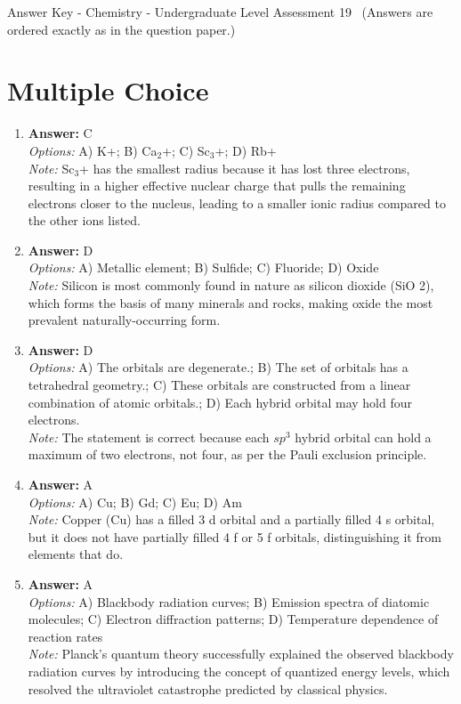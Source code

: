 \documentclass[12pt]{article}
\begin{document}
\begin{center}
Answer Key - Chemistry - Undergraduate Level Assessment 19 \
\small (Answers are ordered exactly as in the question paper.)
\end{center}

\section*{Multiple Choice}
\begin{enumerate}[label=\arabic*.]
\item \textbf{Answer:} C
\\ \textit{Options:} A) K+; B) Ca$_{2}$+; C) Sc$_{3}$+; D) Rb+
\\ \textit{Note:} Sc$_{3}$+ has the smallest radius because it has lost three electrons, resulting in a higher effective nuclear charge that pulls the remaining electrons closer to the nucleus, leading to a smaller ionic radius compared to the other ions listed.
\item \textbf{Answer:} D
\\ \textit{Options:} A) Metallic element; B) Sulfide; C) Fluoride; D) Oxide
\\ \textit{Note:} Silicon is most commonly found in nature as silicon dioxide (SiO 2), which forms the basis of many minerals and rocks, making oxide the most prevalent naturally-occurring form.
\item \textbf{Answer:} D
\\ \textit{Options:} A) The orbitals are degenerate.; B) The set of orbitals has a tetrahedral geometry.; C) These orbitals are constructed from a linear combination of atomic orbitals.; D) Each hybrid orbital may hold four electrons.
\\ \textit{Note:} The statement is correct because each $sp^3$ hybrid orbital can hold a maximum of two electrons, not four, as per the Pauli exclusion principle.
\item \textbf{Answer:} A
\\ \textit{Options:} A) Cu; B) Gd; C) Eu; D) Am
\\ \textit{Note:} Copper (Cu) has a filled 3 d orbital and a partially filled 4 s orbital, but it does not have partially filled 4 f or 5 f orbitals, distinguishing it from elements that do.
\item \textbf{Answer:} A
\\ \textit{Options:} A) Blackbody radiation curves; B) Emission spectra of diatomic molecules; C) Electron diffraction patterns; D) Temperature dependence of reaction rates
\\ \textit{Note:} Planck's quantum theory successfully explained the observed blackbody radiation curves by introducing the concept of quantized energy levels, which resolved the ultraviolet catastrophe predicted by classical physics.
\end{enumerate}
\end{document}

